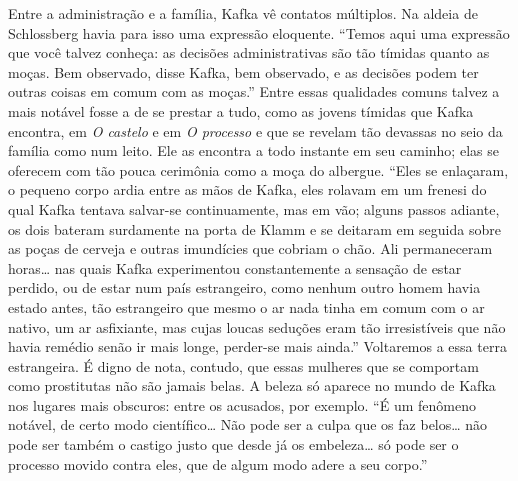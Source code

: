 Entre a administração e a família, Kafka vê contatos múltiplos. Na
aldeia de Schlossberg havia para isso uma expressão eloquente. ``Temos
aqui uma expressão que você talvez conheça: as decisões administrativas
são tão tímidas quanto as moças. Bem observado, disse Kafka, bem
observado, e as decisões podem ter outras coisas em comum com as
moças.'' Entre essas qualidades comuns talvez a mais notável fosse a de
se prestar a tudo, como as jovens tímidas que Kafka encontra, em \textit{O
castelo} e em \textit{O processo} e que se revelam tão devassas no seio da
família como num leito. Ele as encontra a todo instante em seu caminho;
elas se oferecem com tão pouca cerimônia como a moça do albergue. ``Eles
se enlaçaram, o pequeno corpo ardia entre as mãos de Kafka, eles rolavam
em um frenesi do qual Kafka tentava salvar-se continuamente, mas em vão;
alguns passos adiante, os dois bateram surdamente na porta de Klamm e se
deitaram em seguida sobre as poças de cerveja e outras imundícies que
cobriam o chão. Ali permaneceram horas\ldots{} nas quais Kafka experimentou
constantemente a sensação de estar perdido, ou de estar num país
estrangeiro, como nenhum outro homem havia estado antes, tão estrangeiro
que mesmo o ar nada tinha em comum com o ar nativo, um ar asfixiante,
mas cujas loucas seduções eram tão irresistíveis que não havia remédio
senão ir mais longe, perder-se mais ainda.'' Voltaremos a essa terra
estrangeira. É digno de nota, contudo, que essas mulheres que se
comportam como prostitutas não são jamais belas. A beleza só aparece no
mundo de Kafka nos lugares mais obscuros: entre os acusados, por
exemplo. ``É um fenômeno notável, de certo modo científico\ldots{} Não pode
ser a culpa que os faz belos\ldots{} não pode ser também o castigo justo que
desde já os embeleza\ldots{} só pode ser o processo movido contra eles, que
de algum modo adere a seu corpo.''

